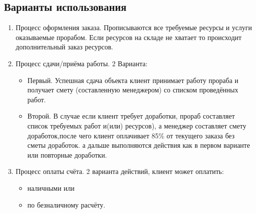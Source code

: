 \subsection{Варианты использования}
\begin{enumerate}
\item Процесс оформления заказа. Прописываются все требуемые ресурсы и услуги оказываемые прорабом. Если ресурсов на складе не хватает то происходит дополнительный заказ ресурсов.
\item Процесс сдачи/приёма работы. 2 Варианта:
	\begin{itemize}
	\item Первый. Успешная сдача объекта клиент принимает работу прораба и получает смету (составленную менеджером) со списком проведённых работ.
	\item Второй. В случае если клиент требует доработки, прораб составляет список требуемых работ и(или) ресурсов), а менеджер составляет смету доработок,после чего клиент оплачивает 85\% от текущего заказа без сметы доработок. а дальше выполняются действия как в первом варианте или повторные доработки.
	\end{itemize}
\item Процесс оплаты счёта. 2 варианта действий, клиент может оплатить:
	\begin{itemize}
	\item наличными или
	\item по безналичному расчёту.
	\end{itemize}
\end{enumerate}
\newpage
